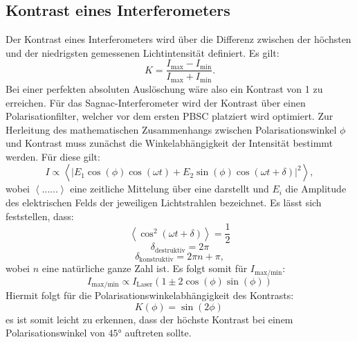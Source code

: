 \subsection{Kontrast eines Interferometers}
Der Kontrast eines Interferometers wird über die  Differenz zwischen der höchsten und der niedrigsten gemessenen Lichtintensität definiert. Es gilt:
\begin{equation}
  K=\frac{I_{\text{max}}-I_{\text{min}}}{I_{\text{max}}+I_{\text{min}}}.
\end{equation}
Bei einer perfekten absoluten Auslöschung wäre also ein Kontrast von 1 zu erreichen. Für das Sagnac-Interferometer wird der Kontrast über einen Polarisationfilter, welcher vor dem ersten PBSC platziert
wird optimiert. Zur Herleitung des mathematischen Zusammenhangs zwischen Polarisationswinkel $\phi$ und Kontrast muss zunächst die Winkelabhängigkeit der Intensität bestimmt werden.
Für diese gilt:
\begin{equation}
I \propto \left<\left|E_1\cos{(\phi)}\cos{(\omega t)}+E_2\sin{(\phi)}\cos{(\omega t+\delta)}\right|^2\right> ,
\end{equation}
wobei $\left<......\right>$ eine zeitliche Mittelung über eine darstellt und $E_i$ die Amplitude des elektrischen Felds der jeweiligen Lichtstrahlen bezeichnet.
Es lässt sich feststellen, dass:
\begin{equation}
  \left<\cos^2(\omega t +\delta)\right> = \frac{1}{2} \nonumber
\end{equation}
\begin{equation}
  \delta_{\text{destruktiv}}=2\pi  \nonumber
\end{equation}
\begin{equation}
  \delta_{\text{konstruktiv}}=2\pi n + \pi \nonumber ,
\end{equation}
wobei $n$ eine natürliche ganze Zahl ist. Es folgt somit für $I_{\text{max}/\text{min}}$:
\begin{equation}
  I_{\text{max}/\text{min}} \propto I_{\text{Laser}}\left(1 \pm 2\cos(\phi)\sin(\phi)\right)
\end{equation}
Hiermit folgt für die Polarisationswinkelabhängigkeit des Kontrasts:
\begin{equation}
  K(\phi)=\sin(2\phi) \,
\end{equation}
es ist somit leicht zu erkennen, dass der höchste Kontrast bei einem Polarisationswinkel von $45°$ auftreten sollte.
